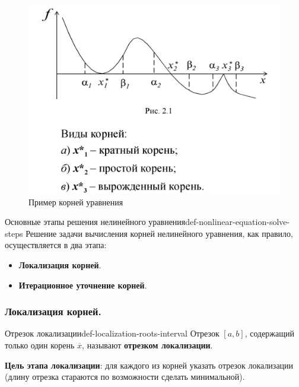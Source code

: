 \documentclass[14pt]{extarticle}
\begin{document}
        \begin{figure}[H]
            \centering
            \includegraphics[scale=0.3]{images/roots-ex.png}
            \caption{Пример корней уравнения}
            \label{fig:roots-example}
        \end{figure}

    \begin{definition}{Основные этапы решения нелинейного уравнения}{def-nonlinear-equation-solve-steps}
        Решение задачи вычисления корней нелинейного уравнения, как правило, осуществляется в два этапа:
        \begin{itemize}
            \item \textbf{Локализация корней}.
            \item \textbf{Итерационное уточнение корней}.
        \end{itemize}
    \end{definition}

    \subsubsection{Локализация корней.}

        \begin{definition}{Отрезок локализации}{def-localization-roots-interval}
            Отрезок $[a, b]$, содержащий только один корень $\overline{x}$, называют \textbf{отрезком локализации}. 
        \end{definition}

        \textbf{Цель этапа локализации}: для каждого из корней указать отрезок локализации (длину отрезка стараются по возможности сделать минимальной).
        
\end{document}
